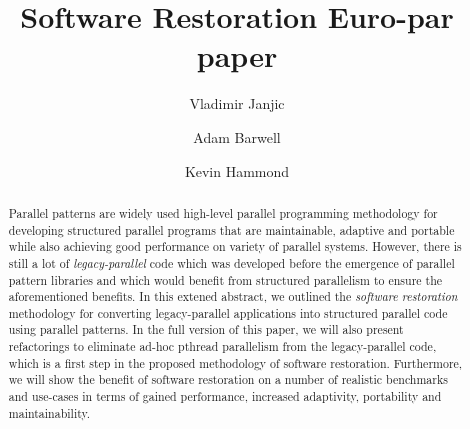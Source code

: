 \documentclass{llncs}
\begin{document}
\title{Software Restoration Euro-par paper}


\author{Vladimir Janjic \and Adam Barwell \and Kevin Hammond}


\maketitle


\begin{abstract}
    Parallel patterns are widely used high-level parallel programming methodology for developing structured parallel programs that are maintainable, adaptive and portable while also achieving good performance on variety of parallel systems. However, there is still a lot of \emph{legacy-parallel} code which was developed before the emergence of parallel pattern libraries and which would benefit from structured parallelism to ensure the aforementioned benefits. 
    In this extened abstract, we outlined the \emph{software restoration} methodology for converting legacy-parallel applications into structured parallel code using parallel patterns. In the full version of this paper, we will also present refactorings to eliminate ad-hoc pthread parallelism from the legacy-parallel code, which is a first step in the proposed methodology of software restoration. Furthermore, we will show the benefit of software restoration on a number of realistic benchmarks and use-cases in terms of gained performance, increased adaptivity, portability and maintainability. 
\end{abstract}


\end{document}
